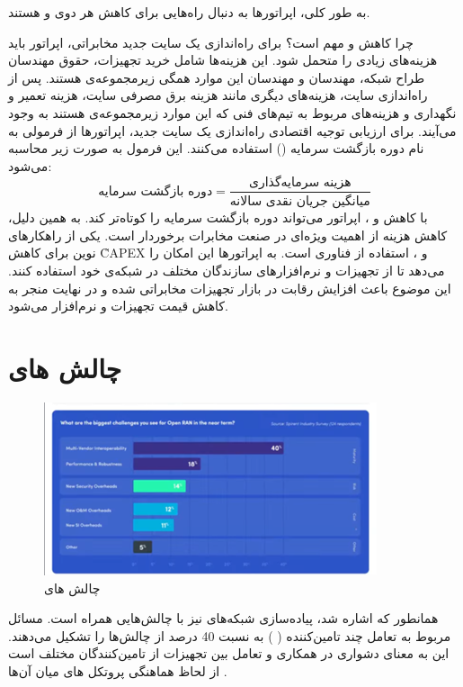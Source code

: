 \documentclass[landscape, 12pt]{report}
\begin{document}
به طور کلی، اپراتورها به دنبال راه‌هایی برای کاهش هر دوی  و  هستند.

چرا کاهش  و  مهم است؟
برای راه‌اندازی یک سایت جدید مخابراتی، اپراتور باید هزینه‌های زیادی را متحمل شود. این هزینه‌ها شامل خرید تجهیزات، حقوق مهندسان طراح شبکه، مهندسان  و مهندسان  این موارد همگی زیرمجموعه‌ی  هستند.
پس از راه‌اندازی سایت، هزینه‌های دیگری مانند هزینه برق مصرفی سایت، هزینه تعمیر و نگهداری و هزینه‌های مربوط به تیم‌های فنی که این موارد زیرمجموعه‌ی  هستند به وجود می‌آیند.
برای ارزیابی توجیه اقتصادی راه‌اندازی یک سایت جدید، اپراتورها از فرمولی به نام دوره بازگشت سرمایه () استفاده می‌کنند. این فرمول به صورت زیر محاسبه می‌شود:
\[
\text{دوره بازگشت سرمایه} = \frac{\text{هزینه سرمایه‌گذاری}}{\text{میانگین جریان نقدی سالانه}}
\]
با کاهش  و ، اپراتور می‌تواند دوره بازگشت سرمایه را کوتاه‌تر کند. به همین دلیل، کاهش هزینه از اهمیت ویژه‌ای در صنعت مخابرات برخوردار است.
یکی از راهکارهای نوین برای کاهش \r{CAPEX} و ، استفاده از فناوری  است.  به اپراتورها این امکان را می‌دهد تا از تجهیزات و نرم‌افزارهای سازندگان مختلف در شبکه‌ی خود استفاده کنند. این موضوع باعث افزایش رقابت در بازار تجهیزات مخابراتی شده و در نهایت منجر به کاهش قیمت تجهیزات و نرم‌افزار می‌شود.


\section*{چالش های 
	}
\begin{figure}[ht]
	\centering
	\includegraphics[width=.6\linewidth]{Pic/ORAN_Challenges}
	\caption{چالش های
	}
	\label{fig:ORAN_Challenges}
\end{figure}
همانطور که اشاره شد، پیاده‌سازی
شبکه‌های
  نیز با چالش‌هایی همراه است. مسائل مربوط به تعامل چند تامین‌کننده
(
) 
به نسبت 40 درصد از چالش‌ها را تشکیل می‌دهند. این به معنای دشواری در همکاری و تعامل بین تجهیزات از تامین‌کنندگان مختلف است از لحاظ هماهنگی پروتکل های میان آن‌ها .
\end{document}

